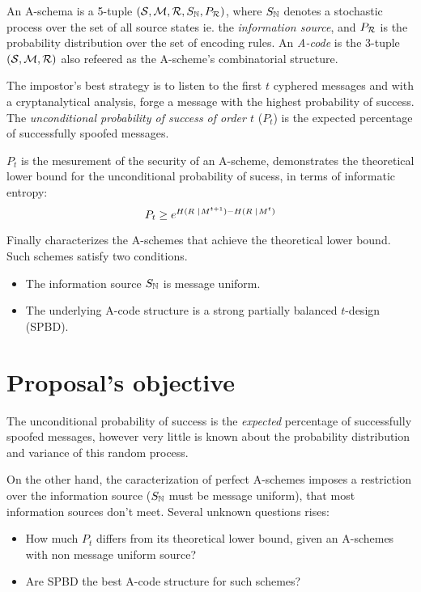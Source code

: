 \documentclass[conference]{IEEEtran}
\begin{document}
An A-schema is a 5-tuple $\left( \mathcal S,\mathcal M,\mathcal R,S_\mathbb{N}, P_\mathcal R \right)$, where $S_\mathbb{N}$ denotes a stochastic process over the set of all source states ie. the \textit{information source}, and $P_\mathcal R$ is the probability distribution over the set of encoding rules. An \textit{A-code} is the 3-tuple $\left( \mathcal S,\mathcal M,\mathcal R\right)$ also refeered as the A-scheme's combinatorial structure.

The impostor's best strategy is to listen to the first $t$ cyphered messages and with a cryptanalytical analysis, forge a message with the highest probability of success. The \textit{unconditional probability of success of order $t$} ($P_t$) is the expected percentage of successfully spoofed messages.

$P_t$ is the mesurement of the security of an A-scheme, \cite{b3} demonstrates the theoretical lower bound for the unconditional probability of sucess, in terms of informatic entropy:
\[
    P_t \geq
    e^{
    H(R\;\; \hspace{-0.2em} \mid \hspace{-0.15em} \;M^{t+1})
    - H(R\;\; \hspace{-0.2em} \mid \hspace{-0.15em} \;M^{t})
    }
\]

Finally \cite{b4} characterizes the A-schemes that achieve the theoretical lower bound. Such schemes satisfy two conditions.
\begin{itemize}
    \item The information source $S_\mathbb{N}$ is message uniform.
    \item The underlying A-code structure is a strong partially balanced $t$-design (SPBD).
\end{itemize}

%
%
\section{Proposal's objective}
The unconditional probability of success is the \textit{expected} percentage of successfully spoofed messages, however very little is known about the probability distribution and variance of this random process.

On the other hand, the caracterization of perfect A-schemes imposes a restriction over the information source ($S_\mathbb{N}$ must be message uniform), that most information sources don't meet. Several unknown questions rises:
\begin{itemize}
    \item How much $P_t$ differs from its theoretical lower bound, given an A-schemes with non message uniform source?
    \item Are SPBD the best A-code structure for such schemes?
\end{itemize}
\end{document}
